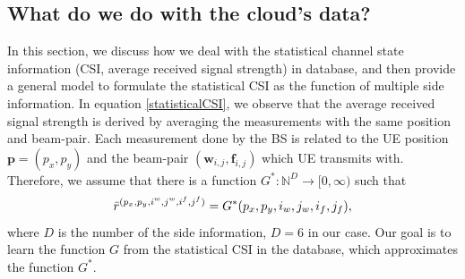 \documentclass[12pt, draftcls, onecolumn]{IEEEtran}
\theoremstyle{plain}
\theoremstyle{definition}
\theoremstyle{remark}
\newcommand{\nt}[1]{\textcolor{red}{\textbf{[#1]}}}
\begin{document}
\subsection{What do we do with the cloud's data?}
\label{sec2_2}
In this section, we discuss how we deal with the statistical channel state information (CSI, average received signal strength) in database, and then provide a general model to formulate the statistical CSI as the function of multiple side information.
In equation \eqref{statisticalCSI}, we observe that the average received signal strength is derived by averaging the measurements with the same position and beam-pair.
Each measurement done by the BS is related to the UE position $\mathbf p = (p_x,p_y)$ and the beam-pair $(\mathbf w_{i,j},\mathbf f_{i,j})$ which UE transmits with.
Therefore, we assume that there is a function $G^*:\mathbb{N}^D\rightarrow [0,\infty)$ such that
\begin{equation}
\label{power_pred_G}
\Bar{r}^{(p_x,p_y,i^w,j^w,i^f,j^f)} = G^*(p_x,p_y,i_w,j_w,i_f,j_f),
\end{equation}
where $D$ is the number of the side information, $D=6$ in our case.
Our goal is to learn the function $G$ from the statistical CSI in the database, which approximates the function $G^*$.
\end{document}
